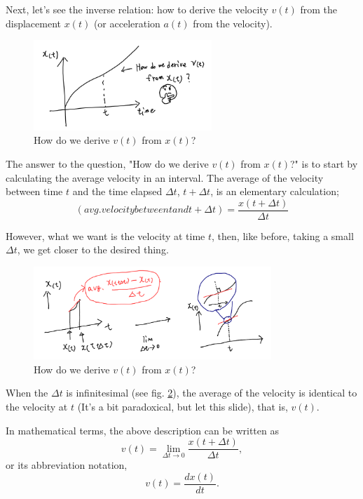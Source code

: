 \documentclass[pdflatex,sn-mathphys-num]{sn-jnl}%
\theoremstyle{thmstyleone}%
\theoremstyle{thmstyletwo}%
\theoremstyle{thmstylethree}%
\begin{document}
Next, let's see the inverse relation: how to derive the velocity $v(t)$ from the displacement $x(t)$ (or acceleration $a(t)$ from the velocity).
\begin{figure}[H]
	\centering
	\includegraphics[width=0.6\textwidth]{images/VFromX.png}
	\caption{How do we derive $v(t)$ from $x(t)$?}
	\label{vfromx}
\end{figure}

The answer to the question, "How do we derive $v(t)$ from $x(t)$?" is to start by calculating the average velocity in an interval.
The average of the velocity between time $t$ and the time elapsed $\Delta t$, $t + \Delta t$, is an elementary calculation;
\begin{equation}
	(avg. velocity between t and t + \Delta t) = \frac{x(t+\Delta t)}{\Delta t} 
\end{equation}

However, what we want is the velocity at time $t$, then, like before, taking a small $\Delta t$, we get closer to the desired thing.
\begin{figure}[H]
	\centering
	\includegraphics[width=0.8\textwidth]{images/fDifferentialFromX.png}
	\caption{How do we derive $v(t)$ from $x(t)$?}
	\label{fDifferentialFromX}
\end{figure}

When the $\Delta t$ is infinitesimal (see fig. \ref{fDifferentialFromX}), the average of the velocity is identical to the velocity at $t$ (It's a bit paradoxical, but let this slide), that is, $v(t)$.

In mathematical terms, the above description can be written as
\begin{equation}
	v(t) = \lim_{\Delta t \rightarrow 0} \frac{x(t+\Delta t)}{\Delta t},
\end{equation}
or its abbreviation notation,
\begin{equation}\label{vdxdt}
v(t) = \frac{dx(t)}{dt}.
\end{equation}
\end{document}
